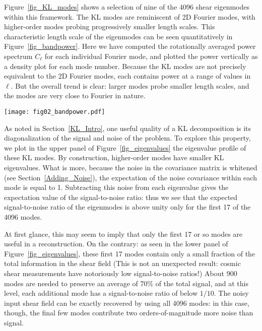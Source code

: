 Figure~\ref{fig_KL_modes} shows a selection of
nine of the 4096 shear eigenmodes within
this framework.  The KL modes are reminiscent of 2D Fourier modes, with
higher-order modes probing progressively smaller length scales.  
This characteristic length scale of the eigenmodes
can be seen quantitatively in Figure~\ref{fig_bandpower}.  
Here we have computed the rotationally averaged
power spectrum $C_\ell$ for each individual Fourier mode, and plotted the
power vertically as a density plot for each mode number.  
Because the KL modes are
not precisely equivalent to the 2D Fourier modes, each contains power at
a range of values in $\ell$.  But the overall trend is clear: larger modes
probe smaller length scales, and the modes are very close to Fourier in
nature.

\begin{figure*}
 \centering
 \texttt{[image: fig02\_bandpower.pdf]}
 \caption{The normalized power spectrum of each KL mode.  For constant
   mode number, the figure represents a histogram of the power in that KL
   mode, normalized to a constant total power.  KL modes represent a 
   linear combination of Fourier modes, so that the power in each KL 
   mode is spread over a range of $\ell$ values.  Nevertheless,
   the general trend is clear: larger mode numbers are associated with
   larger wave numbers, and thus smaller length scales.
   \label{fig_bandpower} }
\end{figure*}

As noted in Section~\ref{KL_Intro}, one useful quality of a KL decomposition
is its diagonalization of the signal and noise of the problem.
To explore this property, we plot in the upper panel of 
Figure~\ref{fig_eigenvalues} the eigenvalue profile 
of these KL modes. By construction, higher-order modes 
have smaller KL eigenvalues.  What is more,
because the noise in the covariance matrix is whitened 
(see Section~\ref{Adding_Noise}), the expectation of the noise covariance
within each mode is equal to 1.  Subtracting this noise from each eigenvalue 
gives the expectation value of the signal-to-noise ratio: 
thus we see that the expected
signal-to-noise ratio of the eigenmodes is above unity only for the first
17 of the 4096 modes.

At first glance, this may seem to imply that only the first 17 or so modes
are useful in a reconstruction.  On the contrary: as seen in the lower panel
of Figure~\ref{fig_eigenvalues}, these first 17 modes contain only a
small fraction of the total information in the shear field (This is not 
an unexpected result: cosmic shear measurements have 
notoriously low signal-to-noise ratios!)
About 900 modes are needed to preserve an average of 70\% of the total signal, 
and at this level, each additional mode has a signal-to-noise ratio 
of below $1/10$.  The noisy input shear field can be exactly recovered
by using all 4096 modes: in this case, though, the final few modes 
contribute two orders-of-magnitude more noise than signal.

